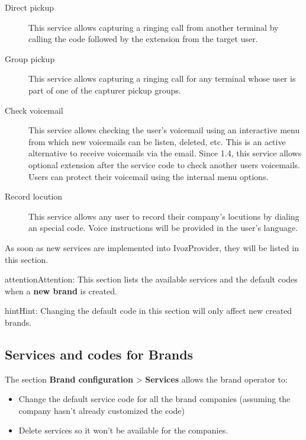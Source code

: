 \documentclass[letterpaper,10pt,english]{sphinxmanual}
\begin{document}
\noindent{}
\begin{description}
\item[{Direct pickup}] \leavevmode{}\label{pbx_features/services:term-direct-pickup}
This service allows capturing a ringing call from another terminal by
calling the code followed by the extension from the target user.

\item[{Group pickup}] \leavevmode{}\label{pbx_features/services:term-group-pickup}
This service allows capturing a ringing call for any terminal whose user
is part of one of the capturer pickup groups.

\item[{Check voicemail}] \leavevmode{}\label{pbx_features/services:term-check-voicemail}
This service allows checking the user's voicemail using an interactive
menu from which new voicemails can be listen, deleted, etc. This is an
active alternative to receive voicemails via the email. Since 1.4, this
service allows optional extension after the service code to check
another users voicemails. Users can protect their voicemail using the
internal menu options.

\item[{Record locution}] \leavevmode{}\label{pbx_features/services:term-record-locution}
This service allows any user to record their company's locutions by
dialing an special code. Voice instructions will be provided in the
user's language.

\end{description}

As soon as new services are implemented into IvozProvider, they will be listed
in this section.

\begin{notice}{attention}{Attention:}
This section lists the available services and the default codes
when a \textbf{new brand} is created.
\end{notice}

\begin{notice}{hint}{Hint:}
Changing the default code in this section will only affect new
created brands.
\end{notice}


\subsection{Services and codes for Brands}
\label{pbx_features/services:services-and-codes-for-brands}
The section \textbf{Brand configuration} \textgreater{} \textbf{Services} allows the brand operator to:
\begin{itemize}
\item {} 
Change the default service code for all the brand companies (assuming the
company hasn't already customized the code)

\item {} 
Delete services so it won't be available for the companies.

\end{itemize}
\end{document}
